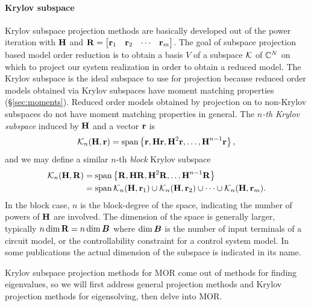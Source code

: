 \paragraph{Krylov subspace}
Krylov subspace projection methods are basically developed out of the power iteration with $\textbf{\textup{H}}$ and $\textbf{\textup{R}}=\begin{bmatrix} \textbf{\textup{r}}_1 & \textbf{\textup{r}}_2 & \cdots & \textbf{\textup{r}}_m\end{bmatrix}$.
   The goal of subspace projection based model order reduction is to obtain a basis $V$ of a subspace $\mathcal{K}$ of $\mathbb{C}^N$ on which to project our system realization in order to obtain a reduced model.    The Krylov subspace is the ideal subspace to use for projection because  reduced order models obtained via Krylov subspaces have moment matching properties (\S\ref{sec:moments}).
Reduced order models obtained by projection on to non-Krylov subspaces do not have moment matching properties in general. 
     The \emph{$n$-th Krylov subspace} induced by $\textbf{\textup{H}}$ and a vector $\textbf{\textup{r}}$ is
      \begin{equation}
          \mathcal{K}_{n}({\textbf{\textup{H}}},{\textbf{\textup{r}}})= \operatorname*{span} \left\{\textbf{\textup{r}}, \textbf{\textup{H}} \textbf{\textup{r}}, \textbf{\textup{H}}^2\textbf{\textup{r}},\ldots, \textbf{\textup{H}}^{n-1}\textbf{\textup{r}}\right\},
          \label{eq:krylov_def}
      \end{equation}
and we may define a similar $n$-th \emph{block} Krylov subspace
	\begin{align}
          \mathcal{K}_{n}({\textbf{\textup{H}}},{\textbf{\textup{R}}})
             &= \operatorname*{span} \left\{\textbf{\textup{R}}, \textbf{\textup{H}} \textbf{\textup{R}}, \textbf{\textup{H}}^2\textbf{\textup{R}},\ldots\textbf{\textup{H}}^{n-1}\textbf{\textup{R}}\right\} \\
             &= \operatorname*{span}   \mathcal{K}_{n}({\textbf{\textup{H}}},{\textbf{\textup{r}}_1}) \cup  \mathcal{K}_{n}({\textbf{\textup{H}}},{\textbf{\textup{r}}_2}) \cup \cdots
 				\cup \mathcal{K}_{n}({\textbf{\textup{H}}},{\textbf{\textup{r}}_m}).
	\label{eq:block_krylov_def}
      \end{align}
In the block case, $n$ is the block-degree of the space, indicating the number of powers of $\textbf{\textup{H}}$ are involved.  The dimension of the space is generally larger, typically $n\dim \textbf{\textup{R}} = n\dim \bm{B}$ where $\dim \bm{B}$ is the number of input terminals of a circuit model, or the controllability constraint for a control system model.   In some publications the actual dimension of the subspace is indicated in its name.  

Krylov subspace projection methods for MOR come out of methods for  finding eigenvalues, so we will first address general projection methods and Krylov projection methods for eigensolving, then delve into MOR.  

 



